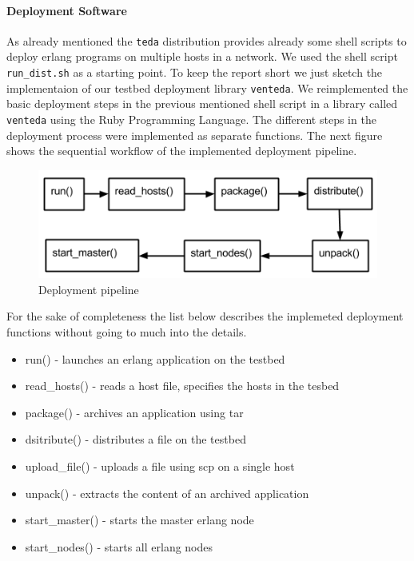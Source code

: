 \documentclass[10pt,a4paper]{article}
\begin{document}
\paragraph{Deployment Software}
As already mentioned the \texttt{teda} distribution provides already some shell scripts to deploy erlang programs on multiple hosts in a network. We used the shell script \texttt{run\_dist.sh} as a starting point. To keep the report short we just sketch the implementaion of our testbed deployment library \texttt{venteda}.
We reimplemented the basic deployment steps in the previous mentioned shell script in a library called \texttt{venteda} using the Ruby Programming Language. The different steps in the deployment process were implemented as separate functions.
The next figure shows the sequential workflow of the implemented deployment pipeline.
\begin{figure}[!htb]
\centering
\includegraphics[scale=0.5]{png/deployment_process.png}
\caption{Deployment pipeline} 
\end{figure}


For the sake of completeness the list below describes the implemeted deployment functions without going to much into the details.
\begin{itemize}
\itemsep0em
\item run() - launches an erlang application on the testbed 
\item read\_hosts() - reads a host file, specifies the hosts in the tesbed
\item package() - archives an application using tar
\item dsitribute() -  distributes a file on the testbed
\item upload\_file() - uploads a file using scp on a single host
\item unpack() - extracts the content of an archived application
\item start\_master() - starts the master erlang node
\item start\_nodes() - starts all erlang nodes

\end{itemize}
\end{document}
